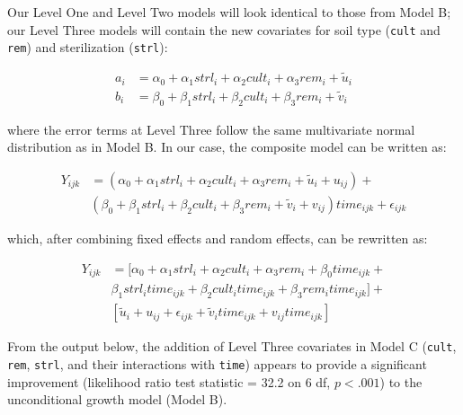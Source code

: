 \documentclass[
]{krantz}
\begin{document}
Our Level One and Level Two models will look identical to those from Model B; our Level Three models will contain the new covariates for soil type (\texttt{cult} and \texttt{rem}) and sterilization (\texttt{strl}):

\begin{align*}
a_{i} & = \alpha_{0}+\alpha_{1}\textstyle{strl}_{i}+\alpha_{2}\textstyle{cult}_{i}+\alpha_{3}\textstyle{rem}_{i}+\tilde{u}_{i} \\
b_{i} & = \beta_{0}+\beta_{1}\textstyle{strl}_{i}+\beta_{2}\textstyle{cult}_{i}+\beta_{3}\textstyle{rem}_{i}+\tilde{v}_{i}
\end{align*}

where the error terms at Level Three follow the same multivariate normal distribution as in Model B. In our case, the composite model can be written as:

\begin{align*}
Y_{ijk} & = (\alpha_{0}+\alpha_{1}\textstyle{strl}_{i}+\alpha_{2}\textstyle{cult}_{i}+\alpha_{3}\textstyle{rem}_{i}+\tilde{u}_{i}+u_{ij}) + \\
 & (\beta_{0}+\beta_{1}\textstyle{strl}_{i}+\beta_{2}\textstyle{cult}_{i}+\beta_{3}\textstyle{rem}_{i}+\tilde{v}_{i}+
 v_{ij})\textstyle{time}_{ijk}+\epsilon_{ijk} 
\end{align*}

which, after combining fixed effects and random effects, can be rewritten as:

\begin{align*}
Y_{ijk} & = [\alpha_{0}+\alpha_{1}\textstyle{strl}_{i}+\alpha_{2}\textstyle{cult}_{i}+\alpha_{3}\textstyle{rem}_{i} +
 \beta_{0}\textstyle{time}_{ijk} + \\
 & \beta_{1}\textstyle{strl}_{i}\textstyle{time}_{ijk}+\beta_{2}\textstyle{cult}_{i}\textstyle{time}_{ijk}+ \beta_{3}\textstyle{rem}_{i}\textstyle{time}_{ijk}] + \\
 & [\tilde{u}_{i}+u_{ij}+\epsilon_{ijk}+\tilde{v}_{i}\textstyle{time}_{ijk}+v_{ij}\textstyle{time}_{ijk}]
\end{align*}

From the output below, the addition of Level Three covariates in Model C (\texttt{cult}, \texttt{rem}, \texttt{strl}, and their interactions with \texttt{time}) appears to provide a significant improvement (likelihood ratio test statistic = 32.2 on 6 df, \(p<.001\)) to the unconditional growth model (Model B).
\end{document}
